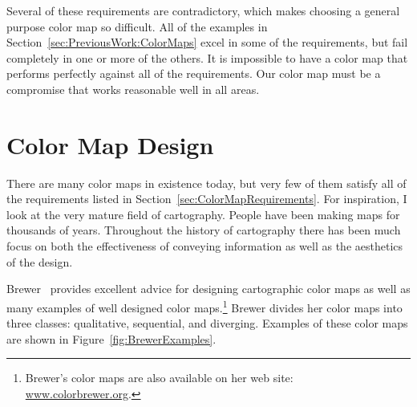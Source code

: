 \documentclass{vgtc}                          %
\newcommand{\scite}[1]{~\cite{#1}}
\begin{document}
Several of these requirements are contradictory, which makes choosing a
general purpose color map so difficult.  All of the examples in
Section~\ref{sec:PreviousWork:ColorMaps} excel in some of the requirements,
but fail completely in one or more of the others.  It is impossible to have
a color map that performs perfectly against all of the requirements.  Our color
map must be a compromise that works reasonable well in all areas.


\section{Color Map Design}
\label{sec:ColorMapDesign}

There are many color maps in existence today, but very few of them satisfy
all of the requirements listed in Section~\ref{sec:ColorMapRequirements}.
For inspiration, I look at the very mature field of cartography.  People
have been making maps for thousands of years.  Throughout the history of
cartography there has been much focus on both the effectiveness of
conveying information as well as the aesthetics of the design.

Brewer\scite{Brewer05} provides excellent advice for designing cartographic
color maps as well as many examples of well designed color
maps.\footnote{Brewer's color maps are also available on her web site:
  \href{http://www.colorbrewer.org}{www.colorbrewer.org}.} Brewer divides
her color maps into three classes: qualitative, sequential, and diverging.
Examples of these color maps are shown in Figure~\ref{fig:BrewerExamples}.
\end{document}
